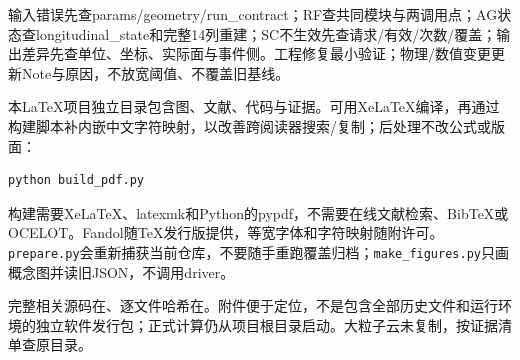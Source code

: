 输入错误先查params/geometry/run\_contract；RF查共同模块与两调用点；AG状态查longitudinal\_state和完整14列重建；SC不生效先查请求/有效/次数/覆盖；输出差异先查单位、坐标、实际面与事件侧。工程修复最小验证；物理/数值变更更新Note与原因，不放宽阈值、不覆盖旧基线。

本LaTeX项目独立目录包含图、文献、代码与证据。可用XeLaTeX编译，再通过构建脚本补内嵌中文字符映射，以改善跨阅读器搜索/复制；后处理不改公式或版面：
\begin{Verbatim}[numbers=none]
python build_pdf.py
\end{Verbatim}
构建需要XeLaTeX、latexmk和Python的pypdf，不需要在线文献检索、BibTeX或OCELOT。Fandol随TeX发行版提供，等宽字体和字符映射随附许可。\texttt{prepare.py}会重新捕获当前仓库，不要随手重跑覆盖归档；\texttt{make\_figures.py}只画概念图并读旧JSON，不调用driver。

完整相关源码在、逐文件哈希在。附件便于定位，不是包含全部历史文件和运行环境的独立软件发行包；正式计算仍从项目根目录启动。大粒子云未复制，按证据清单查原目录。
